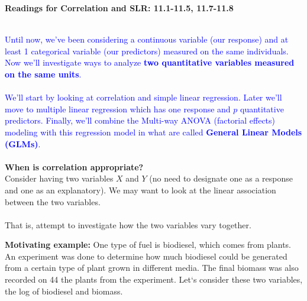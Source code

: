 \begin{center}\large\textbf{Readings for Correlation and SLR: 11.1-11.5, 11.7-11.8}\\ %
\normalsize \end{center}
\large ~\hrulefill
~\\
\textcolor{blue}{Until now, we've been considering a continuous variable (our response) and at least 1 categorical variable (our predictors) measured on the same individuals.  Now we'll investigate ways to analyze \textbf{two quantitative variables measured on the same units}.\\~\\
We'll start by looking at correlation and simple linear regression.  Later we'll move to multiple linear regression which has one response and $p$ quantitative predictors.  Finally, we'll combine the Multi-way ANOVA (factorial effects) modeling with this regression model in what are called \textbf{General Linear Models (GLMs)}.}\\~\\

\textbf{When is correlation appropriate?}\\
Consider having two variables $X$ and $Y$ (no need to designate one as a response and one as an explanatory).  We may want to look at the linear association between the two variables.\\~\\

That is, attempt to investigate how the two variables vary together.

\newpage

\textbf{Motivating example:} One type of fuel is biodiesel, which comes from plants.  An experiment was done to determine how much biodiesel could be generated from a certain type of plant grown in different media.  The final biomass was also recorded on 44 the plants from the experiment.  Let`s consider these two variables, the log of biodiesel and biomass.  \\

